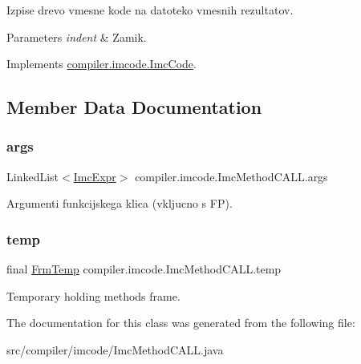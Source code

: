 Izpise drevo vmesne kode na datoteko vmesnih rezultatov.


\begin{DoxyParams}{Parameters}
{\em indent} & Zamik. \\
\hline
\end{DoxyParams}


Implements \hyperlink{interfacecompiler_1_1imcode_1_1_imc_code_a26451dea2ab4dbd7054ac33f4c6d71fe}{compiler.\+imcode.\+Imc\+Code}.



\subsection{Member Data Documentation}
\mbox{\label{classcompiler_1_1imcode_1_1_imc_method_c_a_l_l_a21670c3df2268c7c55bea5075f0b614a}} 
\subsubsection{\texorpdfstring{args}{args}}
{\footnotesize\ttfamily Linked\+List$<$\hyperlink{classcompiler_1_1imcode_1_1_imc_expr}{Imc\+Expr}$>$ compiler.\+imcode.\+Imc\+Method\+C\+A\+L\+L.\+args}

Argumenti funkcijskega klica (vkljucno s FP). \mbox{\label{classcompiler_1_1imcode_1_1_imc_method_c_a_l_l_ae731218c72c3f46608a9c35644e40fe3}} 
\subsubsection{\texorpdfstring{temp}{temp}}
{\footnotesize\ttfamily final \hyperlink{classcompiler_1_1frames_1_1_frm_temp}{Frm\+Temp} compiler.\+imcode.\+Imc\+Method\+C\+A\+L\+L.\+temp}

Temporary holding method\textquotesingle{}s frame. 

The documentation for this class was generated from the following file\+:\begin{DoxyCompactItemize}
\item 
src/compiler/imcode/Imc\+Method\+C\+A\+L\+L.\+java\end{DoxyCompactItemize}
